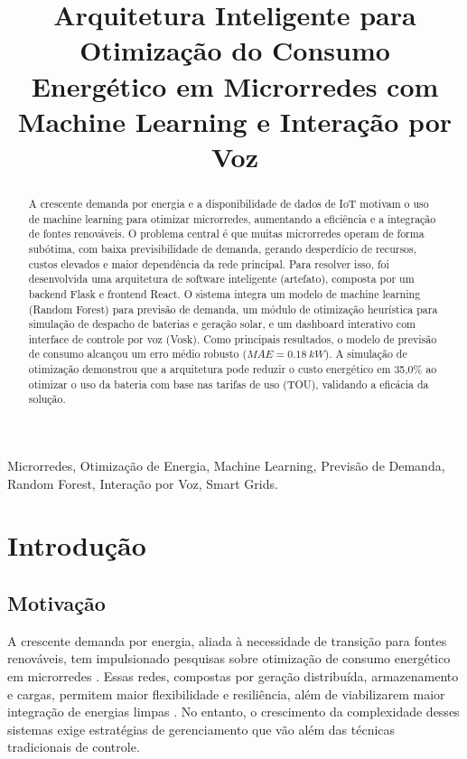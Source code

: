 \documentclass[conference]{IEEEtran}
\title{Arquitetura Inteligente para Otimização do Consumo Energético em Microrredes com Machine Learning e Interação por Voz}
\author{
\IEEEauthorblockN{Tarso Bertolini, Eduardo Contin, Nicole Guarnieri, e Pedro Costa}
\IEEEauthorblockA{\textit{Curso de Bacharelado em Ciência da Computação} \\
\textit{Pontifícia Universidade Católica do Paraná}\\
Curitiba -- PR, Brasil \\
\{autores\}@pucpr.br}
}
\begin{document}
\maketitle

\begin{abstract}
A crescente demanda por energia e a disponibilidade de dados de IoT motivam o uso de machine learning para otimizar microrredes, aumentando a eficiência e a integração de fontes renováveis. O problema central é que muitas microrredes operam de forma subótima, com baixa previsibilidade de demanda, gerando desperdício de recursos, custos elevados e maior dependência da rede principal. Para resolver isso, foi desenvolvida uma arquitetura de software inteligente (artefato), composta por um backend Flask e frontend React. O sistema integra um modelo de machine learning (Random Forest) para previsão de demanda, um módulo de otimização heurística para simulação de despacho de baterias e geração solar, e um dashboard interativo com interface de controle por voz (Vosk). Como principais resultados, o modelo de previsão de consumo alcançou um erro médio robusto ($MAE=0.18~kW$). A simulação de otimização demonstrou que a arquitetura pode reduzir o custo energético em 35,0\% ao otimizar o uso da bateria com base nas tarifas de uso (TOU), validando a eficácia da solução.
\end{abstract}

\begin{IEEEkeywords}
Microrredes, Otimização de Energia, Machine Learning, Previsão de Demanda, Random Forest, Interação por Voz, Smart Grids.
\end{IEEEkeywords}

\section{Introdução}

\subsection{Motivação}
A crescente demanda por energia, aliada à necessidade de transição para fontes renováveis, tem impulsionado pesquisas sobre otimização de consumo energético em microrredes \cite{1}. Essas redes, compostas por geração distribuída, armazenamento e cargas, permitem maior flexibilidade e resiliência, além de viabilizarem maior integração de energias limpas \cite{2}. No entanto, o crescimento da complexidade desses sistemas exige estratégias de gerenciamento que vão além das técnicas tradicionais de controle.
\end{document}
